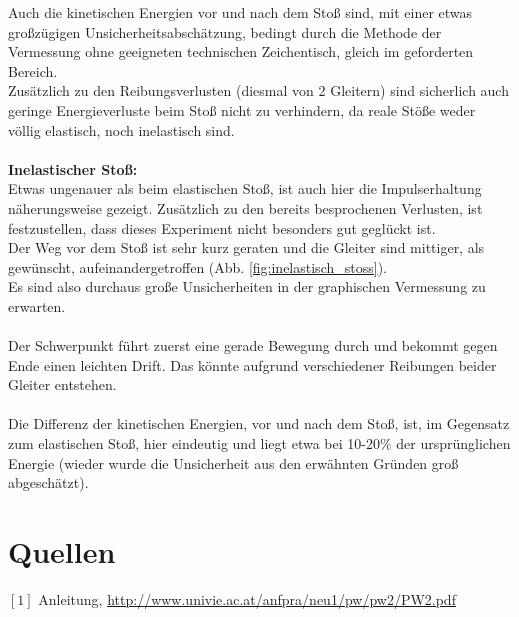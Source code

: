\documentclass[12pt,a4paper]{article}
\begin{document}
\begin{multicols}{2}
Auch die kinetischen Energien vor und nach dem Stoß sind, mit einer etwas großzügigen Unsicherheitsabschätzung, bedingt durch die Methode der Vermessung ohne geeigneten technischen Zeichentisch, gleich im geforderten Bereich.\\
Zusätzlich zu den Reibungsverlusten (diesmal von 2 Gleitern) sind sicherlich auch geringe Energieverluste beim Stoß nicht zu verhindern, da reale Stöße weder völlig elastisch, noch inelastisch sind.\\
\\
\textbf{Inelastischer Stoß:}\\
Etwas ungenauer als beim elastischen Stoß, ist auch hier die Impulserhaltung näherungsweise gezeigt. Zusätzlich zu den bereits besprochenen Verlusten, ist festzustellen, dass dieses Experiment nicht besonders gut geglückt ist.\\
Der Weg vor dem Stoß ist sehr kurz geraten und die Gleiter sind mittiger, als gewünscht, aufeinandergetroffen (Abb. \ref{fig:inelastisch_stoss}).\\
Es sind also durchaus große Unsicherheiten in der graphischen Vermessung zu erwarten.\\
\\
Der Schwerpunkt führt zuerst eine gerade Bewegung durch und bekommt gegen Ende einen leichten Drift. Das könnte aufgrund verschiedener Reibungen beider Gleiter entstehen.\\
\\
Die Differenz der kinetischen Energien, vor und nach dem Stoß, ist, im Gegensatz zum elastischen Stoß, hier eindeutig und liegt etwa bei 10-20\% der ursprünglichen Energie (wieder wurde die Unsicherheit aus den erwähnten Gründen groß abgeschätzt).




\section{Quellen}
$[1]$ Anleitung, \url{http://www.univie.ac.at/anfpra/neu1/pw/pw2/PW2.pdf}\\
\end{multicols}
\end{document}
